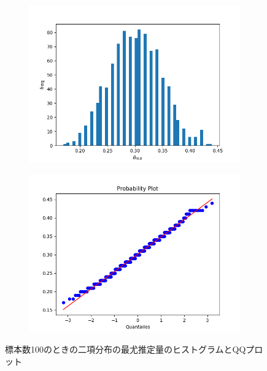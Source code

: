 \documentclass[class=jsarticle, crop=false, dvipdfmx, fleqn]{standalone}
\begin{document}
\begin{figure}
	\centering
    \begin{minipage}{0.45\linewidth}
        \begin{figure}[H]
            \centering
            \includegraphics[clip, width=\linewidth]{../figures/hist_n100.png}
            \label{fig:hist_n100}
        \end{figure}
    \end{minipage}
    \begin{minipage}{0.45\linewidth}
        \begin{figure}[H]
            \centering
            \includegraphics[clip, width=\linewidth]{../figures/qqplot_n100.png}
            \label{fig:qqplot_n100}
        \end{figure}
    \end{minipage}
    \caption{標本数100のときの二項分布の最尤推定量のヒストグラムとQQプロット}
    \label{fig:n100}
\end{figure}
\end{document}
